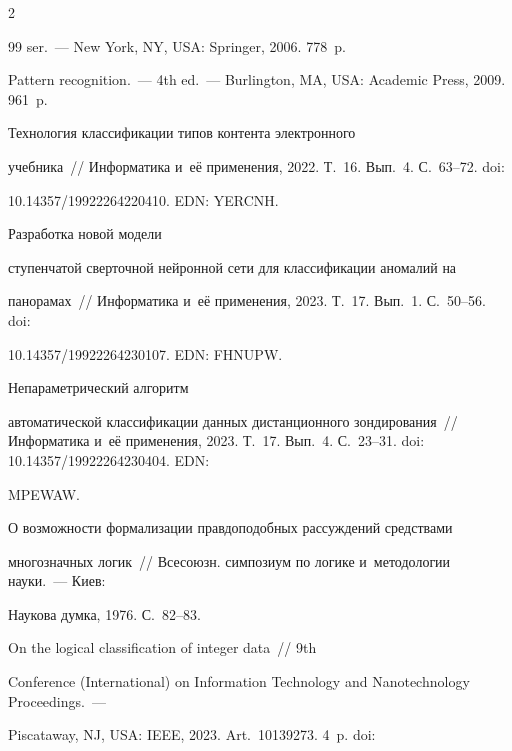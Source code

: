 \begin{multicols}{2}
{{\begin{thebibliography}{99}
ser.~--- New York, NY, USA: Springer, 2006. 778~p.




 Pattern recognition.~--- 4th ed.~--- Burlington, MA, USA: Academic Press, 2009. 961~p.







 Технология классификации типов контента электронного 


учебника~// Информатика и~её применения, 2022. Т.~16. Вып.~4. С.~63--72. doi: 


10.14357/19922264220410. EDN: YERCNH.







 Разработка новой модели 


ступенчатой сверточной нейронной сети для классификации аномалий на 


панорамах~// Информатика и~её применения, 2023. Т.~17. Вып.~1. С.~50--56.  doi: 


10.14357/19922264230107. EDN: FHNUPW.







 Не\-па\-ра\-мет\-ри\-че\-ский алгоритм 


автоматической классификации данных дистанционного зондирования~// Информатика и~её применения, 2023. Т.~17. Вып.~4. С.~23--31. doi: 10.14357/19922264230404. EDN: 


MPEWAW.




 О возможности формализации правдоподобных рассуждений средствами 


многозначных логик~// Всесоюзн. симпозиум по логике и~методологии науки.~--- Киев: 


Наукова думка, 1976. С.~82--83. 




 On the logical classification of integer data~// 9th  


Conference (International) on Information Technology and Nanotechnology Proceedings.~--- 


Piscataway, NJ, USA: IEEE, 2023. Art.~10139273. 4~p. doi: 



\end{thebibliography}}}
\end{multicols}
